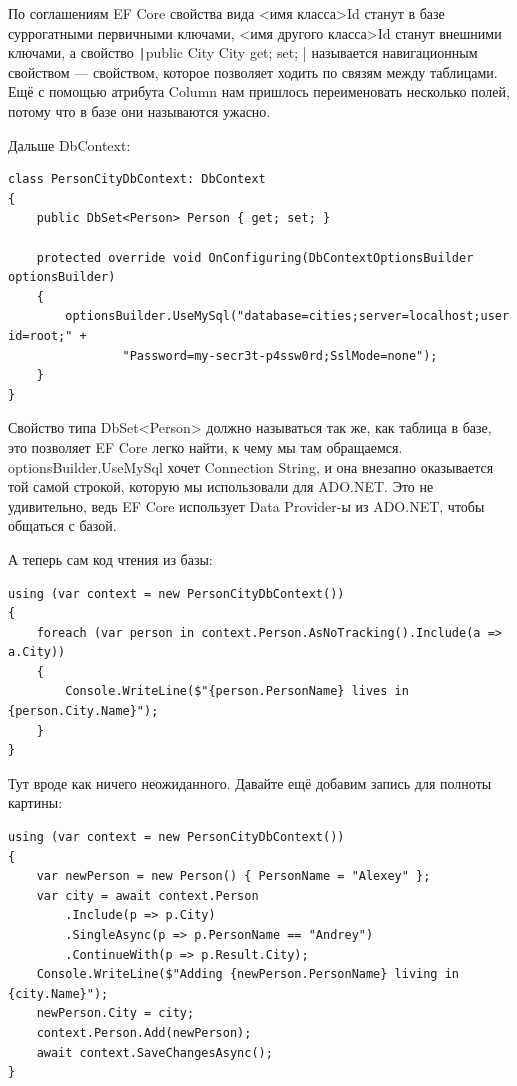 \documentclass{../../text-style}
\begin{document}
По соглашениям EF Core свойства вида <имя класса>Id станут в базе суррогатными первичными ключами, <имя другого класса>Id станут внешними ключами, а свойство \texttt|public City City { get; set; }| называется навигационным свойством --- свойством, которое позволяет ходить по связям между таблицами. Ещё с помощью атрибута Column нам пришлось переименовать несколько полей, потому что в базе они называются ужасно.

Дальше DbContext:

\begin{verbatim}
class PersonCityDbContext: DbContext
{
    public DbSet<Person> Person { get; set; }

    protected override void OnConfiguring(DbContextOptionsBuilder optionsBuilder)
    {
        optionsBuilder.UseMySql("database=cities;server=localhost;user id=root;" +
                "Password=my-secr3t-p4ssw0rd;SslMode=none");
    }
}
\end{verbatim}

Свойство типа DbSet<Person> должно называться так же, как таблица в базе, это позволяет EF Core легко найти, к чему мы там обращаемся. optionsBuilder.UseMySql хочет Connection String, и она внезапно оказывается той самой строкой, которую мы использовали для ADO.NET. Это не удивительно, ведь EF Core использует Data Provider-ы из ADO.NET, чтобы общаться с базой.

А теперь сам код чтения из базы:

\begin{verbatim}
using (var context = new PersonCityDbContext())
{
    foreach (var person in context.Person.AsNoTracking().Include(a => a.City))
    {
        Console.WriteLine($"{person.PersonName} lives in {person.City.Name}");
    }
}
\end{verbatim}

Тут вроде как ничего неожиданного. Давайте ещё добавим запись для полноты картины:

\begin{verbatim}
using (var context = new PersonCityDbContext())
{
    var newPerson = new Person() { PersonName = "Alexey" };
    var city = await context.Person
        .Include(p => p.City)
        .SingleAsync(p => p.PersonName == "Andrey")
        .ContinueWith(p => p.Result.City);
    Console.WriteLine($"Adding {newPerson.PersonName} living in {city.Name}");
    newPerson.City = city;
    context.Person.Add(newPerson);
    await context.SaveChangesAsync();
}
\end{verbatim}
\end{document}
